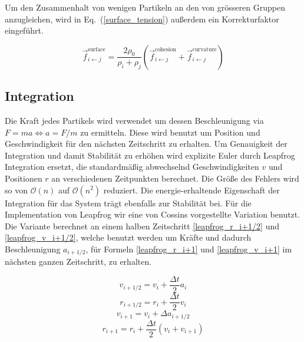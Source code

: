 \documentclass[a4paper]{paper}
\renewcommand{\eqref}[1]{Eq.~(\ref{#1})}
\begin{document}
Um den Zusammenhalt von wenigen Partikeln an den von grösseren Gruppen anzugleichen, wird in \eqref{surface_tension} außerdem ein Korrekturfaktor eingeführt.

\begin{equation}
	\label{surface_tension}
	\vec{f}_{i\leftarrow j}^{\text{surface}} = \frac{2\rho_{0}}{\rho_{i}+\rho_{j}} (\vec{f}_{i\leftarrow j}^{\text{cohesion}} + \vec{f}_{i\leftarrow j}^{\text{curvature}})
\end{equation}



\subsection{Integration}

Die Kraft jedes Partikels wird verwendet um dessen Beschleunigung via $F=ma \Leftrightarrow  a = F/m$ zu ermitteln. Diese wird benutzt um Position und Geschwindigkeit für den nächsten Zeitschritt zu erhalten.
Um Genauigkeit der Integration und damit Stabilität zu erhöhen wird explizite Euler durch Leapfrog Integration ersetzt, die standardmäßig abwechselnd Geschwindigkeiten $v$ und Positionen $r$ an verschiedenen Zeitpunkten berechnet. Die Größe des Fehlers wird so von $\mathcal{O}(n)$ auf $\mathcal{O}(n^2)$ reduziert. Die energie-erhaltende Eigenschaft der Integration für das System trägt ebenfalls zur Stabilität bei.  
Für die Implementation von Leapfrog wir eine von Cossins \citep{Leapfrog} vorgestellte Variation benutzt. Die Variante berechnet an einem halben Zeitschritt \ref{leapfrog_r_i+1/2} und \ref{leapfrog_v_i+1/2}, welche benutzt werden um Kräfte und dadurch Beschleunigung $a_{i+1/2}$, für Formeln \ref{leapfrog_r_i+1} und \ref{leapfrog_v_i+1} im nächsten ganzen Zeitschritt, zu erhalten.



\begin{equation}
\label{leapfrog_v_i+1/2}
v_{i+1/2} = v_{i}+\frac{\Delta t}{2}a_{i}
\end{equation}
\begin{equation}
\label{leapfrog_r_i+1/2}
r_{i+1/2} = r_{i}+\frac{\Delta t}{2}v_{i}
\end{equation}
\begin{equation}
\label{leapfrog_v_i+1}
v_{i+1} = v_{i} + \Delta a_{i+1/2}
\end{equation}
\begin{equation}
\label{leapfrog_r_i+1}
r_{i+1} = r_{i} + \frac{\Delta t}{2} (v_{i} + v_{i+1})
\end{equation}
\end{document}
